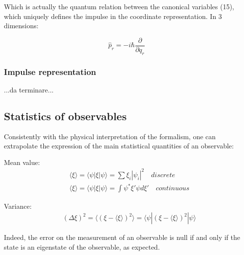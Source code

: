\documentclass{report}
\begin{document}
Which is actually the quantum relation between the canonical variables (15),
which uniquely defines the impulse in the coordinate representation.
In 3 dimensions:

\begin{tcolorbox}[colframe=gray!50, colback=gray!10, coltitle=black, title=Coordinate representation of the impulse]
  \begin{equation}
    \hat{p}_r = -i\hbar \frac{\partial}{\partial q_r}
  \end{equation}
\end{tcolorbox}

\subsubsection{Impulse representation}

...da terminare...

\subsection{Statistics of observables}

Consistently with the physical interpretation of the formalism, one can extrapolate the
expression of the main statistical quantities of an observable:

\begin{tcolorbox}[colframe=gray!50, colback=gray!10, coltitle=black, title=Statistics of an observable]
  Mean value:
  \begin{equation}
    \begin{aligned}
       & \langle \xi\rangle = \langle \psi|\xi|\psi\rangle = \sum \xi_i |\psi_i|^2 \quad discrete       \\
       & \langle \xi\rangle = \langle \psi|\xi|\psi\rangle = \int \psi^*\xi'\psi d\xi' \quad continuous
    \end{aligned}
  \end{equation}

  Variance:
  \begin{equation}
    \begin{aligned}
       & (\Delta \xi)^2=\langle (\xi-\langle \xi\rangle )^2\rangle = \langle \psi|(\xi-\langle \xi\rangle )^2|\psi\rangle
    \end{aligned}
  \end{equation}
\end{tcolorbox}

Indeed, the error on the measurement of an observable is null if and only if the state is an eigenstate of the observable, as expected.
\end{document}
